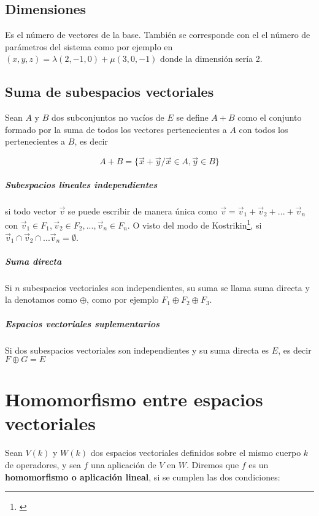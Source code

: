 \section{Dimensiones}
Es el número de vectores de la base. También se corresponde con el el número de parámetros 
del sistema como por ejemplo en ${(x,y,z)=\lambda(2,-1,0)+\mu(3,0,-1)}$ donde la dimensión sería 2.

\section{Suma de subespacios vectoriales}

Sean $A$ y $B$ dos subconjuntos no vacíos de $E$ se define $A+B$ como el conjunto formado por la
suma de todos los vectores pertenecientes a $A$ con todos los pertenecientes a $B$, es decir

$$A+B = \{\vec{x}+\vec{y}/\vec{x}\in A, \vec{y}\in B\}$$

\paragraph{Subespacios lineales independientes} si todo vector $\vec{v}$ se puede escribir de manera
única como $\vec{v}=\vec{v}_1+\vec{v}_2+ ... +\vec{v}_n$ con $\vec{v}_1\in F_1, \vec{v}_2\in F_2,
..., \vec{v}_n\in F_n$. O visto del modo de Kostrikin\footnote{\cite[p60]{kostrikin}},
si $\vec{v}_1\cap\vec{v}_2\cap...\vec{v}_n=\emptyset$.

\paragraph{Suma directa} Si $n$ subespacios vectoriales son independientes, su suma se llama suma
directa y la denotamos como $\oplus$, como por ejemplo $F_1 \oplus F_2 \oplus F_3$.

\paragraph{Espacios vectoriales suplementarios} Si dos subespacios vectoriales son independientes y
su suma directa es $E$, es decir $F\oplus G = E$

\chapter{Homomorfismo entre espacios vectoriales}
Sean $V(k)$ y $W(k)$ dos espacios vectoriales definidos sobre el mismo cuerpo $k$ de operadores, y
sea $f$ una aplicación de $V$ en $W$. Diremos que $f$ es un \textbf{homomorfismo o aplicación
lineal}, si se cumplen las dos condiciones:

